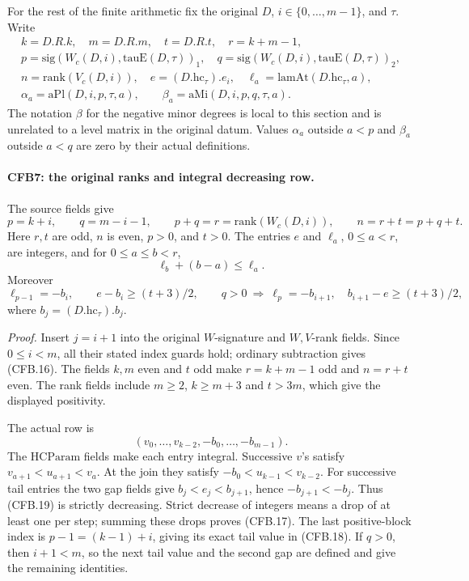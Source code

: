 For the rest of the finite arithmetic fix the original \(D\),
\(i\in\{0,\ldots,m-1\}\), and \(\tau\).  Write
\[
 \begin{gathered}
 k=D.R.k,\quad m=D.R.m,\quad t=D.R.t,\quad r=k+m-1,\\
 p=\mathrm{sig}(W_c(D,i),\mathrm{tauE}(D,\tau))_1,
 \quad q=\mathrm{sig}(W_c(D,i),\mathrm{tauE}(D,\tau))_2,\\
 n=\mathrm{rank}(V_c(D,i)),\quad e=(D.\mathrm{hc}_\tau).e_i,
 \quad \ell_a=\mathrm{lamAt}(D.\mathrm{hc}_\tau,a),\\
 \alpha_a=\mathrm{aPl}(D,i,p,\tau,a),\qquad
 \beta_a=\mathrm{aMi}(D,i,p,q,\tau,a).
 \end{gathered}                                                 \tag{CFB.15}
\]
The notation \(\beta\) for the negative minor degrees is local to
this section and is unrelated to a level matrix in the original
datum.  Values \(\alpha_a\) outside \(a<p\) and \(\beta_a\)
outside \(a<q\) are zero by their actual definitions.

\paragraph{CFB7: the original ranks and integral decreasing row.}
\label{claim:CFB7}
The source fields give
\[
 p=k+i,\qquad q=m-i-1,\qquad p+q=r=\mathrm{rank}(W_c(D,i)),
 \qquad n=r+t=p+q+t.                                          \tag{CFB.16}
\]
Here \(r,t\) are odd, \(n\) is even, \(p>0\), and \(t>0\).
The entries \(e\) and \(\ell_a\), \(0\le a<r\), are integers,
and for \(0\le a\le b<r\),
\[
                    \ell_b+(b-a)\le\ell_a.                    \tag{CFB.17}
\]
Moreover
\[
 \ell_{p-1}=-b_i,\qquad e-b_i\ge(t+3)/2,
 \qquad
 q>0\ \Longrightarrow\ 
       \ell_p=-b_{i+1},\quad b_{i+1}-e\ge(t+3)/2,
                                                               \tag{CFB.18}
\]
where \(b_j=(D.\mathrm{hc}_\tau).b_j\).

\emph{Proof.}
Insert \(j=i+1\) into the original \(W\)-signature and
\(W,V\)-rank fields.  Since \(0\le i<m\), all their stated
index guards hold; ordinary subtraction gives (CFB.16).
The fields \(k,m\) even and \(t\) odd make \(r=k+m-1\) odd
and \(n=r+t\) even.  The rank fields include \(m\ge2\),
\(k\ge m+3\) and \(t>3m\), which give the displayed positivity.

The actual row is
\[
       (v_0,\ldots,v_{k-2},-b_0,\ldots,-b_{m-1}).              \tag{CFB.19}
\]
The \(\mathrm{HCParam}\) fields make each entry integral.
Successive \(v\)'s satisfy
\(v_{a+1}<u_{a+1}<v_a\).
At the join they satisfy \(-b_0<u_{k-1}<v_{k-2}\).
For successive tail entries the two gap fields give
\(b_j<e_j<b_{j+1}\), hence \(-b_{j+1}<-b_j\).
Thus (CFB.19) is strictly decreasing.  Strict decrease of integers
means a drop of at least one per step; summing these drops proves
(CFB.17).  The last positive-block index is
\(p-1=(k-1)+i\), giving its exact tail value in (CFB.18).
If \(q>0\), then \(i+1<m\), so the next tail value and the
second gap are defined and give the remaining identities.

